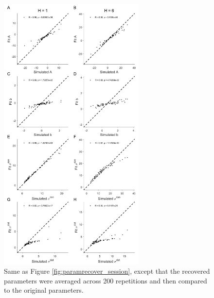 \documentclass[12pt]{article}
\begin{document}
	\begin{figure}[hp]
		\begin{center}
			\includegraphics[width=0.65\textwidth]{figures/RDBayes_parameterrecovery_subject.jpg}
			\caption{Same as Figure \ref{fig:paramrecover_session}, except that the recovered parameters were averaged across 200 repetitions and then compared to the original parameters.}
			\label{fig:paramrecover_sub}
		\end{center}
	\end{figure} 
	
\end{document}

